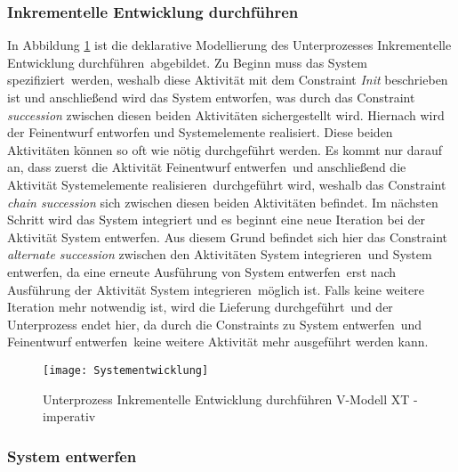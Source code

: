 {\subsubsection{Inkrementelle Entwicklung durchführen}
In Abbildung \ref{fig:Systementwicklung} ist die deklarative Modellierung des Unterprozesses \grqq Inkrementelle Entwicklung durchführen\grqq \ abgebildet. \newline
Zu Beginn muss das \grqq System spezifiziert\grqq \ werden, weshalb diese Aktivität mit dem Constraint \textit{Init} beschrieben ist und anschließend wird das \grqq System entworfen\grqq, was durch das Constraint \textit{succession} zwischen diesen beiden Aktivitäten sichergestellt wird.\newline
Hiernach wird der Feinentwurf entworfen und Systemelemente realisiert. Diese beiden Aktivitäten können so oft wie nötig durchgeführt werden. Es kommt nur darauf an, dass zuerst die Aktivität \grqq Feinentwurf entwerfen\grqq \ und anschließend die Aktivität \grqq Systemelemente realisieren\grqq \ durchgeführt wird, weshalb das Constraint \textit{chain succession} sich zwischen diesen beiden Aktivitäten befindet. \newline
Im nächsten Schritt wird das System integriert und es beginnt eine neue Iteration bei der Aktivität System entwerfen. Aus diesem Grund befindet sich hier das Constraint \textit{alternate succession} zwischen den Aktivitäten \grqq System integrieren\grqq \ und \grqq System entwerfen\grqq, da eine erneute Ausführung von \grqq System entwerfen\grqq \ erst nach Ausführung der Aktivität \grqq System integrieren\grqq \ möglich ist. \newline
Falls keine weitere Iteration mehr notwendig ist, wird die \grqq Lieferung durchgeführt\grqq \ und der Unterprozess endet hier, da durch die Constraints zu \grqq System entwerfen\grqq \ und \grqq Feinentwurf entwerfen\grqq \ keine weitere Aktivität mehr ausgeführt werden kann. \newline
\begin{figure}[!htbp]
\begin{center}
  \texttt{[image: Systementwicklung]} %
  \caption{Unterprozess Inkrementelle Entwicklung durchführen V-Modell XT - imperativ}
  \label{fig:Systementwicklung}
\end{center}
\end{figure}



\subsubsection{System entwerfen}


}

